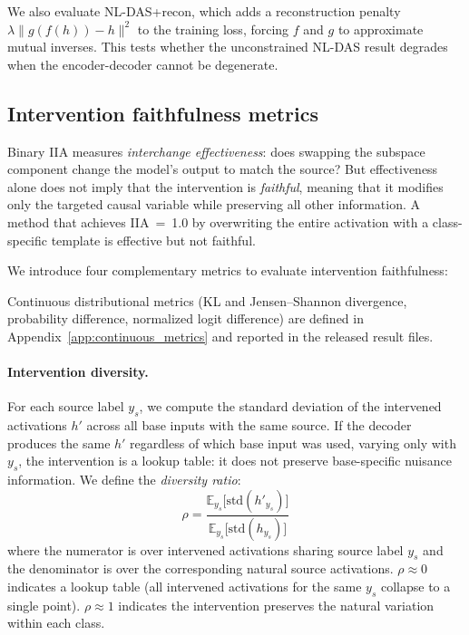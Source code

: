 \documentclass{article}
\begin{document}
We also evaluate NL-DAS+recon, which adds a reconstruction penalty
$\lambda \| g(f(h)) - h \|^2$ to the training loss, forcing $f$ and $g$ to
approximate mutual inverses. This tests whether the unconstrained NL-DAS result
degrades when the encoder-decoder cannot be degenerate.

\subsection{Intervention faithfulness metrics}
\label{sec:faithfulness_metrics}

Binary IIA measures \emph{interchange effectiveness}: does swapping the
subspace component change the model's output to match the source? But
effectiveness alone does not imply that the intervention is \emph{faithful}, meaning that it modifies
only the targeted causal variable while preserving all other information. A method that achieves IIA~=~1.0 by overwriting the entire
activation with a class-specific template is effective but not faithful.

We introduce four complementary metrics to evaluate intervention faithfulness:

Continuous distributional metrics (KL and Jensen--Shannon divergence,
probability difference, normalized logit difference) are defined in
Appendix~\ref{app:continuous_metrics} and reported in the released result
files.

\paragraph{Intervention diversity.}
For each source label $y_s$, we compute the standard deviation of the intervened
activations $h'$ across all base inputs with the same source. If the decoder
produces the same $h'$ regardless of which base input was used, varying only with $y_s$, the
intervention is a lookup table: it does not preserve
base-specific nuisance information. We define the \emph{diversity ratio}:
\begin{equation}
\rho = \frac{\mathbb{E}_{y_s}\bigl[\text{std}(h'_{y_s})\bigr]}
            {\mathbb{E}_{y_s}\bigl[\text{std}(h_{y_s})\bigr]}
\label{eq:diversity_ratio}
\end{equation}
where the numerator is over intervened activations sharing source label $y_s$
and the denominator is over the corresponding natural source activations.
$\rho \approx 0$ indicates a lookup table (all intervened activations for the
same $y_s$ collapse to a single point). $\rho \approx 1$ indicates the
intervention preserves the natural variation within each class.
\end{document}
